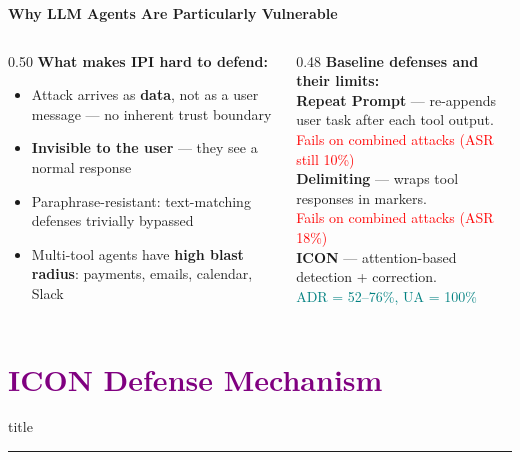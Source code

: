 \documentclass[aspectratio=169]{beamer}
\begin{document}
\begin{frame}{\textcolor{cmindsblue}{\textbf{Why LLM Agents Are Particularly Vulnerable}}}
  \vspace{-0.3cm}

  \begin{columns}[T]
    \begin{column}{0.50\textwidth}
      \textcolor{cmindsblue}{\textbf{What makes IPI hard to defend:}}
      \begin{itemize}
        \item Attack arrives as \textbf{data}, not as a user message —
              no inherent trust boundary
        \item \textbf{Invisible to the user} — they see a normal response
        \item Paraphrase-resistant: text-matching defenses trivially bypassed
        \item Multi-tool agents have \textbf{high blast radius}:
              payments, emails, calendar, Slack
      \end{itemize}
    \end{column}

    \begin{column}{0.48\textwidth}
      \textcolor{cmindsblue}{\textbf{Baseline defenses and their limits:}}\\[4pt]
      {\small
      \textbf{Repeat Prompt} — re-appends user task after each tool output.\\
      \textcolor{red}{Fails on combined attacks (ASR still 10\%)}\\[4pt]
      \textbf{Delimiting} — wraps tool responses in markers.\\
      \textcolor{red}{Fails on combined attacks (ASR 18\%)}\\[4pt]
      \textbf{ICON} — attention-based detection + correction.\\
      \textcolor{teal}{ADR = 52–76\%, UA = 100\%}
      }
    \end{column}
  \end{columns}
\end{frame}


\section{\textbf{\textcolor{purple}{ICON Defense Mechanism}}}
\begin{frame}[plain]\vfill\centering
  \begin{beamercolorbox}[sep=8pt,center,shadow=true,rounded=true]{title}
    \insertsectionhead\par
    \color{oxfordblue}\noindent\rule{10cm}{1pt}
  \end{beamercolorbox}\vfill
\end{frame}
\end{document}
